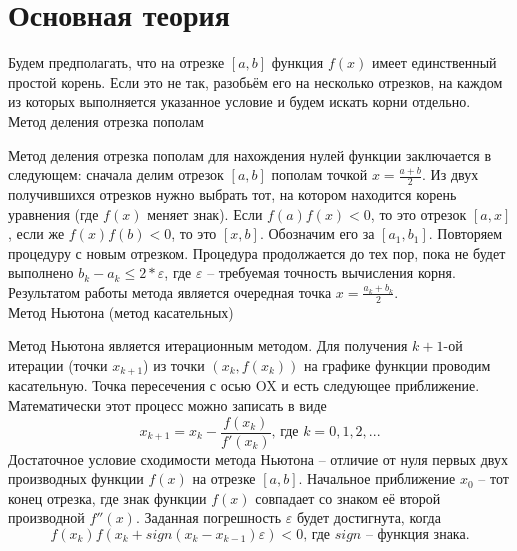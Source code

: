\documentclass[a4paper, 14pt]{extarticle}
\begin{document}
\section{Основная теория}
\begin{justify}

Будем предполагать, что на отрезке $[a, b]$ функция $f(x)$ имеет единственный простой корень. Если это не так, 
разобьём его на несколько отрезков, на каждом из которых выполняется указанное условие и будем искать корни 
отдельно. \\

\noindent\large {Метод деления отрезка пополам}\\ \normalsize

Метод деления отрезка пополам для нахождения нулей функции заключается в следующем: 
сначала делим отрезок $[a, b]$ пополам точкой $x = \frac{a + b}{2}$. Из двух получившихся отрезков 
нужно выбрать тот, на котором находится корень уравнения (где $f(x)$ меняет знак). Если $f(a)f(x)<0$, то это отрезок 
$[a, x]$, если же $f(x)f(b)<0$, то это $[x, b]$. Обозначим его за $[a_1, b_1]$. Повторяем процедуру с новым отрезком. 
Процедура продолжается до тех пор, пока не будет выполнено $b_k - a_k \leq 2*\varepsilon$, 
где $\varepsilon$ -- требуемая точность вычисления корня. Результатом работы метода является очередная точка 
$x = \frac{a_k + b_k}{2}$. \\

\noindent\large {Метод Ньютона (метод касательных)}\\ \normalsize

Метод Ньютона является итерационным методом. Для получения $k+1$-ой итерации (точки $x_{k+1}$) из точки 
$(x_k, f(x_k))$ на графике функции проводим касательную. Точка пересечения с осью OX и есть следующее приближение. 
Математически этот процесс можно записать в виде 
\[
x_{k+1} = x_k - \frac{f(x_k)}{f'(x_k)} \text{, где } k = 0, 1, 2, ...
\]
Достаточное условие сходимости метода Ньютона -- отличие от нуля первых двух производных функции $f(x)$ на отрезке 
$[a, b]$. Начальное приближение $x_0$ -- тот конец отрезка, где знак функции $f(x)$ совпадает со знаком её второй 
производной $f''(x)$. Заданная погрешность $\varepsilon$ будет достигнута, когда 
\[
f(x_k)f(x_k + sign(x_k - x_{k-1})\varepsilon)<0 \text{, где } sign \text{ -- функция знака}. 
\]

\end{justify}
\pagebreak
\end{document}

